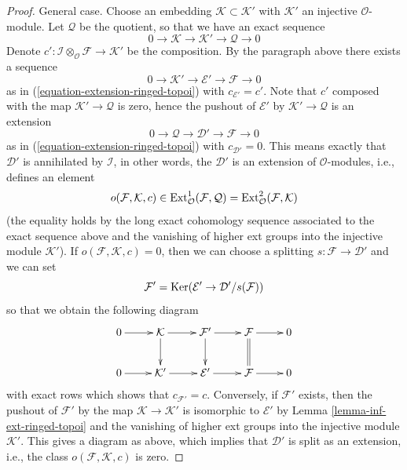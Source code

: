 \begin{proof}
\medskip\noindent
General case. Choose an embedding $\mathcal{K} \subset \mathcal{K}'$
with $\mathcal{K}'$ an injective $\mathcal{O}$-module. Let $\mathcal{Q}$
be the quotient, so that we have an exact sequence
$$
0 \to \mathcal{K} \to \mathcal{K}' \to \mathcal{Q} \to 0
$$
Denote
$c' : \mathcal{I} \otimes_\mathcal{O} \mathcal{F} \to \mathcal{K}'$
be the composition. By the paragraph above there exists a sequence
$$
0 \to \mathcal{K}' \to \mathcal{E}' \to \mathcal{F} \to 0
$$
as in (\ref{equation-extension-ringed-topoi}) with $c_{\mathcal{E}'} = c'$.
Note that $c'$ composed with the map $\mathcal{K}' \to \mathcal{Q}$
is zero, hence the pushout of $\mathcal{E}'$ by
$\mathcal{K}' \to \mathcal{Q}$ is an extension
$$
0 \to \mathcal{Q} \to \mathcal{D}' \to \mathcal{F} \to 0
$$
as in (\ref{equation-extension-ringed-topoi}) with $c_{\mathcal{D}'} = 0$.
This means exactly that $\mathcal{D}'$ is annihilated by
$\mathcal{I}$, in other words, the $\mathcal{D}'$ is an extension
of $\mathcal{O}$-modules, i.e., defines an element
$$
o(\mathcal{F}, \mathcal{K}, c) \in
\mathop{\mathrm{Ext}}\nolimits^1_\mathcal{O}(\mathcal{F}, \mathcal{Q}) =
\mathop{\mathrm{Ext}}\nolimits^2_\mathcal{O}(\mathcal{F}, \mathcal{K})
$$
(the equality holds by the long exact cohomology sequence associated
to the exact sequence above and the vanishing of higher ext groups
into the injective module $\mathcal{K}'$). If
$o(\mathcal{F}, \mathcal{K}, c) = 0$, then we can choose a splitting
$s : \mathcal{F} \to \mathcal{D}'$ and we can set
$$
\mathcal{F}' = \mathop{\mathrm{Ker}}(\mathcal{E}' \to \mathcal{D}'/s(\mathcal{F}))
$$
so that we obtain the following diagram
$$
\xymatrix{
0 \ar[r] &
\mathcal{K} \ar[r] \ar[d] &
\mathcal{F}' \ar[r] \ar[d] &
\mathcal{F} \ar[r] \ar@{=}[d] &
0 \\
0 \ar[r] &
\mathcal{K}' \ar[r] &
\mathcal{E}' \ar[r] &
\mathcal{F} \ar[r] & 0
}
$$
with exact rows which shows that $c_{\mathcal{F}'} = c$. Conversely, if
$\mathcal{F}'$ exists, then the pushout of $\mathcal{F}'$ by the map
$\mathcal{K} \to \mathcal{K}'$ is isomorphic to $\mathcal{E}'$ by
Lemma \ref{lemma-inf-ext-ringed-topoi} and the vanishing of higher ext groups
into the injective module $\mathcal{K}'$. This gives a diagram
as above, which implies that $\mathcal{D}'$ is split as an extension, i.e.,
the class $o(\mathcal{F}, \mathcal{K}, c)$ is zero.
\end{proof}

